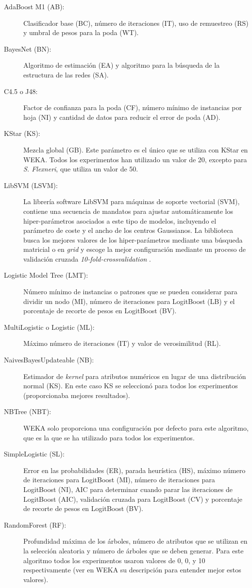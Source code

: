 \begin{description}
	\item[AdaBoost M1 (AB):] Clasificador base (BC), número de iteraciones (IT), uso de
remuestreo (RS) y umbral de pesos para la poda (WT).
   \item[BayesNet (BN):] Algoritmo de estimación (EA) y algoritmo para la búsqueda de la
estructura de las redes (SA).
   \item[C4.5 o J48:] Factor de confianza para la poda (CF), número mínimo de instancias
por hoja (NI) y cantidad de datos para reducir el error de poda (AD).
   \item[KStar (KS):] Mezcla global (GB). Este parámetro es el único que se utiliza con
KStar en WEKA. Todos los experimentos han utilizado un valor de 20, excepto para \textit{S.
Flexneri}, que utiliza un valor de 50.
   \item[LibSVM (LSVM):] La librería software LibSVM para máquinas de soporte vectorial
(SVM), contiene una secuencia de mandatos para ajustar automáticamente los
hiper-parámetros asociados a este tipo de modelos, incluyendo el parámetro de coste y el
ancho de los centros Gaussianos. La biblioteca busca los mejores valores de los hiper-parámetros
mediante una búsqueda matricial o en \textit{grid} y escoge la mejor configuración
mediante un proceso de validación cruzada \textit{10-fold-crossvalidation}
\cite{Chang2001}.
   \item[Logistic Model Tree (LMT):] Número mínimo de instancias o patrones que se pueden
considerar para dividir un nodo (MI), número de iteraciones para LogitBoost (LB) y el
porcentaje de recorte de pesos en LogitBoost (BV).
   \item[MultiLogistic o Logistic (ML):] Máximo número de iteraciones (IT) y valor de
verosimilitud (RL).
   \item[NaivesBayesUpdateable (NB):] Estimador de \textit{kernel} para
    atributos numéricos en lugar de una distribución normal (KS). En este caso KS se
	seleccionó para todos los experimentos (proporcionaba mejores resultados).
	   \item[NBTree (NBT):] WEKA solo proporciona una configuración por defecto para este
algoritmo, que es la que se ha utilizado para todos los experimentos.
   \item[SimpleLogistic (SL):] Error en las probabilidades (ER), parada heurística (HS),
máximo número de iteraciones para LogitBoost (MI), número de iteraciones para LogitBoost
(NI), AIC para determinar cuando parar las iteraciones de LogitBoost (AIC), validación
cruzada para LogitBoost (CV) y porcentaje de recorte de pesos en LogitBoost (BV).
\item[RandomForest (RF):] Profundidad máxima de los árboles, número de atributos que se
utilizan en la selección aleatoria y número de árboles que se deben generar. Para este
algoritmo todos los experimentos usaron valores de 0, 0, y 10 respectivamente (ver en
WEKA su descripción para entender mejor estos valores).
\end{description}


